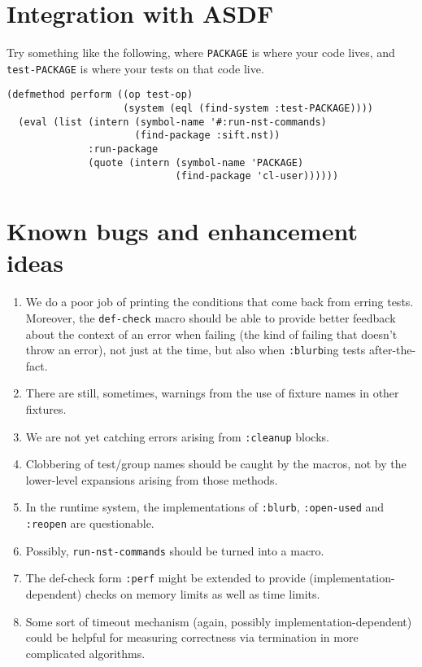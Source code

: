 \documentclass{article}
\begin{document}
%

\section{Integration with ASDF}
Try something like the following, where \texttt{PACKAGE} is where
your code lives, and \texttt{test-PACKAGE} is where your tests on that
code live.
\begin{verbatim}
(defmethod perform ((op test-op)
                    (system (eql (find-system :test-PACKAGE))))
  (eval (list (intern (symbol-name '#:run-nst-commands)
                      (find-package :sift.nst))
              :run-package
              (quote (intern (symbol-name 'PACKAGE)
                             (find-package 'cl-user))))))
\end{verbatim}

\section{Known bugs and enhancement ideas}
\begin{enumerate}
\item We do a poor job of printing the conditions that come back from
  erring tests.  Moreover, the
  \texttt{def-check} macro should
  be able to provide better feedback about the context of an error
  when failing (the kind of failing that doesn't throw an error), not
  just at the time, but also when
  \texttt{:blurb}ing tests
  after-the-fact.
\item There are still, sometimes, warnings from the use of fixture
  names in other fixtures.
\item We are not yet catching errors arising from
  \texttt{:cleanup} blocks.
\item Clobbering of test/group names should be caught by the macros,
  not by the lower-level expansions arising from those methods.
\item In the runtime system, the implementations of
  \texttt{:blurb},
  \texttt{:open-used} and
  \texttt{:reopen} are questionable.
\item Possibly,
  \texttt{run-nst-commands}
  should be turned into a macro.
\item The def-check form \texttt{:perf} might be extended to provide
  (implementation-dependent) checks on memory limits as well as time
  limits.
\item Some sort of timeout mechanism (again, possibly
  implementation-dependent) could be helpful for measuring correctness
  via termination in more complicated algorithms.
\end{enumerate}

\printindex
\end{document}
